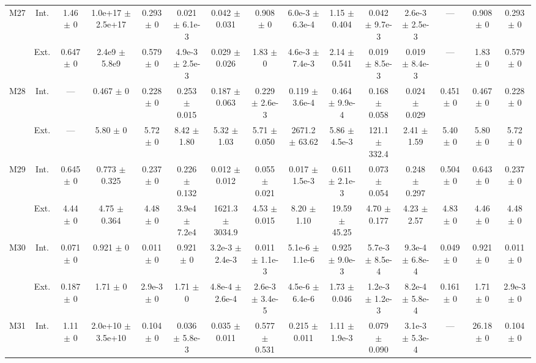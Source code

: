 \begin{table}[htbp]
{\begin{tabular}{@{}ccccccccccccccc@{}}
\cline{2-15}
\multirow{2}{*}{M27} & Int. & 1.46 $\pm$ 0 & 1.0e+17 $\pm$ 2.5e+17 & 0.293 $\pm$ 0 & 0.021 $\pm$ 6.1e-3 & 0.042 $\pm$ 0.031 & 0.908 $\pm$ 0 & 6.0e-3 $\pm$ 6.3e-4 & 1.15 $\pm$ 0.404 & 0.042 $\pm$ 9.7e-3 & 2.6e-3 $\pm$ 2.5e-3 & --- & 0.908 $\pm$ 0 & 0.293 $\pm$ 0 \\
 & Ext. & 0.647 $\pm$ 0 & 2.4e9 $\pm$ 5.8e9 & 0.579 $\pm$ 0 & 4.9e-3 $\pm$ 2.5e-3 & 0.029 $\pm$ 0.026 & 1.83 $\pm$ 0 & 4.6e-3 $\pm$ 7.4e-3 & 2.14 $\pm$ 0.541 & 0.019 $\pm$ 8.5e-3 & 0.019 $\pm$ 8.4e-3 & --- & 1.83 $\pm$ 0 & 0.579 $\pm$ 0 \\
\cline{2-15}
\multirow{2}{*}{M28} & Int. & --- & 0.467 $\pm$ 0 & 0.228 $\pm$ 0 & 0.253 $\pm$ 0.015 & 0.187 $\pm$ 0.063 & 0.229 $\pm$ 2.6e-3 & 0.119 $\pm$ 3.6e-4 & 0.464 $\pm$ 9.9e-4 & 0.168 $\pm$ 0.058 & 0.024 $\pm$ 0.029 & 0.451 $\pm$ 0 & 0.467 $\pm$ 0 & 0.228 $\pm$ 0 \\
 & Ext. & --- & 5.80 $\pm$ 0 & 5.72 $\pm$ 0 & 8.42 $\pm$ 1.80 & 5.32 $\pm$ 1.03 & 5.71 $\pm$ 0.050 & 2671.2 $\pm$ 63.62 & 5.86 $\pm$ 4.5e-3 & 121.1 $\pm$ 332.4 & 2.41 $\pm$ 1.59 & 5.40 $\pm$ 0 & 5.80 $\pm$ 0 & 5.72 $\pm$ 0 \\
\cline{2-15}
\multirow{2}{*}{M29} & Int. & 0.645 $\pm$ 0 & 0.773 $\pm$ 0.325 & 0.237 $\pm$ 0 & 0.226 $\pm$ 0.132 & 0.012 $\pm$ 0.012 & 0.055 $\pm$ 0.021 & 0.017 $\pm$ 1.5e-3 & 0.611 $\pm$ 2.1e-3 & 0.073 $\pm$ 0.054 & 0.248 $\pm$ 0.297 & 0.504 $\pm$ 0 & 0.643 $\pm$ 0 & 0.237 $\pm$ 0 \\
 & Ext. & 4.44 $\pm$ 0 & 4.75 $\pm$ 0.364 & 4.48 $\pm$ 0 & 3.9e4 $\pm$ 7.2e4 & 1621.3 $\pm$ 3034.9 & 4.53 $\pm$ 0.015 & 8.20 $\pm$ 1.10 & 19.59 $\pm$ 45.25 & 4.70 $\pm$ 0.177 & 4.23 $\pm$ 2.57 & 4.83 $\pm$ 0 & 4.46 $\pm$ 0 & 4.48 $\pm$ 0 \\
\cline{2-15}
\multirow{2}{*}{M30} & Int. & 0.071 $\pm$ 0 & 0.921 $\pm$ 0 & 0.011 $\pm$ 0 & 0.921 $\pm$ 0 & 3.2e-3 $\pm$ 2.4e-3 & 0.011 $\pm$ 1.1e-3 & 5.1e-6 $\pm$ 1.1e-6 & 0.925 $\pm$ 9.0e-3 & 5.7e-3 $\pm$ 8.5e-4 & 9.3e-4 $\pm$ 6.8e-4 & 0.049 $\pm$ 0 & 0.921 $\pm$ 0 & 0.011 $\pm$ 0 \\
 & Ext. & 0.187 $\pm$ 0 & 1.71 $\pm$ 0 & 2.9e-3 $\pm$ 0 & 1.71 $\pm$ 0 & 4.8e-4 $\pm$ 2.6e-4 & 2.6e-3 $\pm$ 3.4e-5 & 4.5e-6 $\pm$ 6.4e-6 & 1.73 $\pm$ 0.046 & 1.2e-3 $\pm$ 1.2e-3 & 8.2e-4 $\pm$ 5.8e-4 & 0.161 $\pm$ 0 & 1.71 $\pm$ 0 & 2.9e-3 $\pm$ 0 \\
\cline{2-15}
\multirow{2}{*}{M31} & Int. & 1.11 $\pm$ 0 & 2.0e+10 $\pm$ 3.5e+10 & 0.104 $\pm$ 0 & 0.036 $\pm$ 5.8e-3 & 0.035 $\pm$ 0.011 & 0.577 $\pm$ 0.531 & 0.215 $\pm$ 0.011 & 1.11 $\pm$ 1.9e-3 & 0.079 $\pm$ 0.090 & 3.1e-3 $\pm$ 5.3e-4 & --- & 26.18 $\pm$ 0 & 0.104 $\pm$ 0 \\

\end{tabular}}
\end{table}
